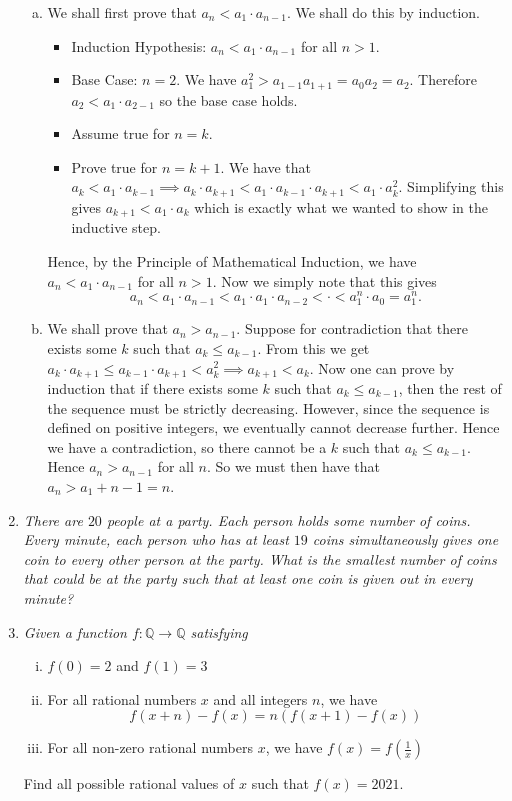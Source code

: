 \documentclass{article}
\begin{document}
\begin{enumerate}[1.]
\begin{enumerate}[a)]
  \item We shall first prove that $a_n < a_1 \cdot a_{n - 1}$. We shall do this by induction.
  \begin{itemize}
    \item Induction Hypothesis: $a_n < a_1 \cdot a_{n - 1}$ for all $n > 1$.
    \item Base Case: $n = 2$. We have $a_{1}^2 > a_{1 - 1}a_{1 + 1} = a_0a_2 = a_2$. Therefore $a_2 < a_1 \cdot a_{2 - 1}$ so the base case holds.
    \item Assume true for $n = k$.
    \item Prove true for $n = k + 1$. We have that $a_k < a_1 \cdot a_{k - 1} \implies a_k \cdot a_{k + 1} < a_1 \cdot a_{k - 1} \cdot a_{k + 1} < a_1 \cdot a_k^2$. Simplifying this gives $a_{k + 1} < a_1 \cdot a_k$ which is exactly what we wanted to show in the inductive step.
  \end{itemize}
  Hence, by the Principle of Mathematical Induction, we have $a_n < a_1 \cdot a_{n - 1}$ for all $n > 1$. Now we simply note that this gives 
  $$a_n < a_1 \cdot a_{n - 1} < a_1 \cdot a_1 \cdot a_{n - 2} < \cdot < a_1^n \cdot a_0 = a_1^n.$$
  \item We shall prove that $a_n > a_{n - 1}$. Suppose for contradiction that there exists some $k$ such that $a_k \le a_{k - 1}$. From this we get $a_k \cdot a_{k + 1} \le a_{k - 1} \cdot a_{k + 1} < a_k^2 \implies a_{k + 1} < a_k$. Now one can prove by induction that if there exists some $k$ such that $a_k \le a_{k - 1}$, then the rest of the sequence must be strictly decreasing. However, since the sequence is defined on positive integers, we eventually cannot decrease further. Hence we have a contradiction, so there cannot be a $k$ such that $a_k \le a_{k - 1}$. Hence $a_n > a_{n - 1}$ for all $n$. So we must then have that $a_n > a_1 + {n - 1} = n$.
\end{enumerate}

\item %
{\itshape There are $20$ people at a party. Each person holds some number of coins. Every minute, each person who has at least $19$ coins simultaneously gives one coin to every other person at the party. What is the smallest number of coins that could be at the party such that at least one coin is given out in every minute?}


\item %
{\itshape Given a function $f: \mathbb{Q} \rightarrow \mathbb{Q}$ satisfying
\begin{enumerate}[i)]
  \item $f(0) = 2$ and $f(1) = 3$
  \item For all rational numbers $x$ and all integers $n$, we have 
  $$f(x + n) - f(x) = n(f(x + 1) - f(x)) $$
  \item For all non-zero rational numbers $x$, we have $f(x) = f(\frac{1}{x})$
\end{enumerate}
Find all possible rational values of $x$ such that $f(x) = 2021$.}


\end{enumerate}
\end{document}
